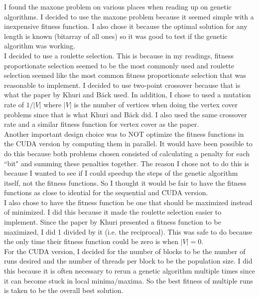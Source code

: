 \documentclass[9pt]{article}
\begin{document}
I found the maxone problem on various places when reading up on genetic algorithms. I decided to use the maxone problem because it seemed simple with a inexpensive fitness function. I also chose it because the optimal solution for any length is known (bitarray of all ones) so it was good to test if the genetic algorithm was working.\\

I decided to use a roulette selection. This is because in my readings, fitness proportionate selection seemed to be the most commonly used and roulette selection seemed like the most common fitness proportionate selection that was reasonable to implement. I decided to use two-point crossover because that is what the paper by Khuri and B{\"a}ck used. In addition, I chose to used a mutation rate of $1/|V|$ where $|V|$ is the number of vertices when doing the vertex cover problems since that is what Khuri and B{\"a}ck did. I also used the same crossover rate and a similar fitness function for vertex cover as the paper.\\

Another important design choice was to NOT optimize the fitness functions in the CUDA version by computing them in parallel. It would have been possible to do this because both problems chosen consisted of calculating a penalty for each ``bit" and summing these penalties together. The reason I chose not to do this is because I wanted to see if I could speedup the steps of the genetic algorithm itself, not the fitness functions. So I thought it would be fair to have the fitness functions as close to idential for the sequential and CUDA version.\\

I also chose to have the fitness function be one that should be maximized instead of minimized. I did this because it made the roulette selection easier to implement. Since the paper by Khuri presented a fitness function to be maximized, I did 1 divided by it (i.e. the reciprocal). This was safe to do because the only time their fitness function could be zero is when $|V| = 0$.\\

For the CUDA version, I decided for the number of blocks to be the number of runs desired and the number of threads per block to be the population size. I did this because it is often necessary to rerun a genetic algorithm multiple times since it can become stuck in local minima/maxima. So the best fitness of multiple runs is taken to be the overall best solution.
\end{document}
